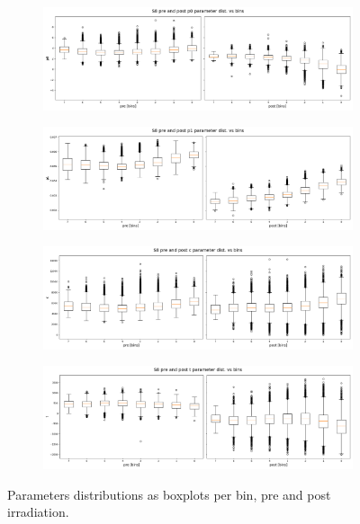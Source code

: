 \begin{figure}[H]
    \centering
\begin{subfigure}[b]{0.85\textwidth}
    \centering
    \includegraphics[width=\linewidth]{figures/chapter4/surrogates/p2_box_plot0.png}
  \end{subfigure}
\begin{subfigure}[b]{0.85\textwidth}
    \centering
    \includegraphics[width=\linewidth]{figures/chapter4/surrogates/p2_box_plot1.png}
  \end{subfigure}
\begin{subfigure}[b]{0.85\textwidth}
    \centering
    \includegraphics[width=\linewidth]{figures/chapter4/surrogates/p2_box_plot2.png}
  \end{subfigure}
\begin{subfigure}[b]{0.85\textwidth}
    \centering
    \includegraphics[width=\linewidth]{figures/chapter4/surrogates/p2_box_plot3.png}
  \end{subfigure}
    \label{plot:surr_s8_bins}
  \caption[Parameters in s8 bins]{Parameters distributions as boxplots per bin, pre and post irradiation.}
\end{figure}



